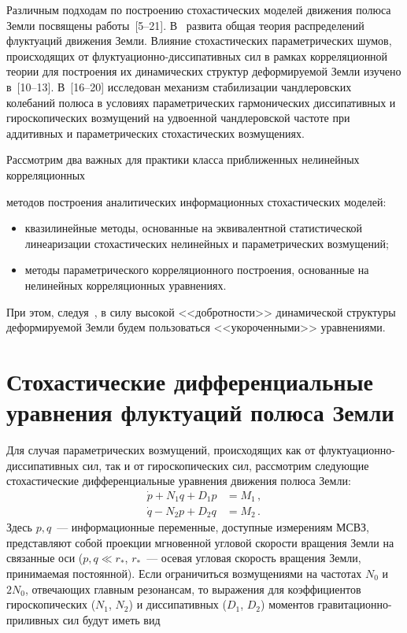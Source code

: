 \begin{multicols}{2}
{}


Различным подходам по построению стохастических моделей движения
полюса Земли посвящены работы~[5--21]. В~\cite{9s, 10s, 13s, 15s} развита
общая тео\-рия распределений флуктуаций движения Земли. Влияние
стохастических параметрических шумов, происходящих от
флуктуационно-дис\-си\-па\-тив\-ных сил в рамках корреляционной %
теории для
построения их динамических структур деформируемой Земли изучено
в~[10--13]. %
В~[16--20] исследован механизм стабилизации %
чандлеровских колебаний полюса в условиях параметрических
гармонических диссипативных и гиро\-скопических возмущений на
удвоенной чандлеровской частоте при аддитивных
 и параметрических стохастических возмущениях.

Рассмотрим два важных для практики класса приближенных нелинейных
корреляционных\linebreak
\vspace*{-12pt}
\pagebreak

\noindent
 методов построения аналитических информационных
стохастических моделей:
\begin{itemize}
\item квазилинейные методы, основанные на эквивалентной
статистической линеаризации стохастических нелинейных и
параметрических возмущений;
\item методы параметрического корреляционного построения, основанные на
нелинейных корреляционных уравнениях.
\end{itemize}


При этом, следуя~\cite{22s}, в силу высокой <<добротности>> динамической
структуры деформируемой Земли будем пользоваться <<укороченными>>
уравнениями.


\section{Стохастические дифференциальные уравнения флуктуаций полюса Земли}

Для случая параметрических возмущений, происходящих
 как от флуктуационно-диссипативных сил, так и от гироскопических
 сил, рассмотрим следующие стохастические дифференциальные
 уравнения движения полюса Земли:
\begin{align}
\dot{p} + N_1 q + D_1 p &= M_1\,, \label{e1si} \\
\dot{q} - N_2 p + D_2 q &= M_2\,. \label{e2si}
\end{align}
Здесь $p,q$~--- информационные переменные, доступные измерениям МСВЗ,
представляют собой проекции мгновенной угловой скорости вращения
Земли на связанные оси ($p,q \ll r_*$, $r_*$~--- осевая угловая
скорость вращения Земли, принимаемая постоянной). Если ограничиться
возмущениями на час\-то\-тах $N_0$ и $2 N_0$, отвечающих главным
резонансам, %
то выражения для коэффициентов гироскопических
($N_1$, $N_2$) и диссипативных ($D_1$, $D_2$) моментов
гравитационно-приливных сил будут иметь вид
{

}
\end{multicols}
